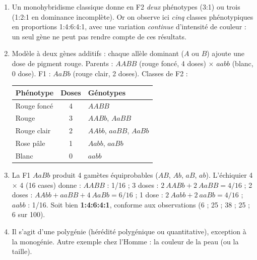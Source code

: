 \documentclass[11pt]{article}
\newcommand{\cle}[1]{{\popxbold\color{popdark}#1}}
\begin{document}
\begin{corrige}
\begin{enumerate}
\item Un monohybridisme classique donne en F2 \emph{deux} phénotypes (3:1) ou trois (1:2:1 en dominance incomplète). Or on observe ici \emph{cinq} classes phénotypiques en proportions 1:4:6:4:1, avec une variation \emph{continue} d'intensité de couleur : un seul gène ne peut pas rendre compte de ces résultats.
\item Modèle à deux gènes additifs : chaque allèle dominant ($A$ ou $B$) ajoute une dose de pigment rouge. Parents : $AABB$ (rouge foncé, 4 doses) $\times$ $aabb$ (blanc, 0 dose). F1 : $AaBb$ (rouge clair, 2 doses). Classes de F2 :
\begin{center}
\begin{tabular}{|l|c|l|}
\hline
\rowcolor{popblueL} Phénotype & Doses & Génotypes \\
\hline
Rouge foncé & 4 & $AABB$ \\
\hline
Rouge & 3 & $AABb$, $AaBB$ \\
\hline
Rouge clair & 2 & $AAbb$, $aaBB$, $AaBb$ \\
\hline
Rose pâle & 1 & $Aabb$, $aaBb$ \\
\hline
Blanc & 0 & $aabb$ \\
\hline
\end{tabular}
\end{center}
\item La F1 $AaBb$ produit 4 gamètes équiprobables ($AB$, $Ab$, $aB$, $ab$). L'échiquier 4 $\times$ 4 (16 cases) donne : $AABB$ : 1/16 ; 3 doses : $2\ AABb + 2\ AaBB = 4/16$ ; 2 doses : $AAbb + aaBB + 4\ AaBb = 6/16$ ; 1 dose : $2\ Aabb + 2\ aaBb = 4/16$ ; $aabb$ : 1/16. Soit bien \textbf{1:4:6:4:1}, conforme aux observations (6 ; 25 ; 38 ; 25 ; 6 sur 100).
\item Il s'agit d'une \cle{polygénie} (hérédité polygénique ou quantitative), exception à la monogénie. Autre exemple chez l'Homme : la \cle{couleur de la peau} (ou la taille).
\end{enumerate}
\end{corrige}
\end{document}
